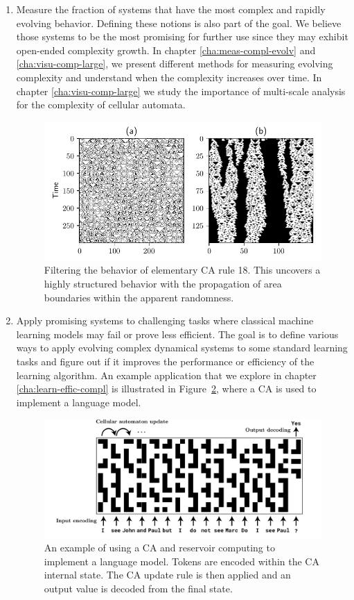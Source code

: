 \begin{enumerate}
  \item Measure the fraction of systems that have the most complex and rapidly
        evolving behavior. Defining these notions is also part of the goal. We
        believe those systems to be the most promising for further use since
        they may exhibit open-ended complexity growth. In chapter
        \ref{cha:meas-compl-evolv} and \ref{cha:visu-comp-large}, we present
        different methods for measuring evolving complexity and understand when
        the complexity increases over time. In chapter \ref{cha:visu-comp-large}
        we study the importance of multi-scale analysis for the complexity of
        cellular automata.
\begin{figure}[htbp]
  \centering
 \includegraphics[width=.9\linewidth]{figures/rule18_small}
 \caption{Filtering the behavior of elementary \acl{CA} rule 18. This
   uncovers a highly structured behavior with the propagation of area boundaries
   within the apparent randomness.}
  \label{fig:rule_18}
\end{figure}

  \item Apply promising systems to challenging tasks where classical machine
        learning models may fail or prove less efficient. The goal is to define
        various ways to apply evolving complex dynamical systems to some
        standard learning tasks and figure out if it improves the performance or
        efficiency of the learning algorithm. An example application that we
        explore in chapter \ref{cha:learn-effic-compl} is illustrated in
        Figure~\ref{fig:ca_lm}, where a \ac{CA} is used to implement a language
        model.
\begin{figure}[htbp]
  \centering
  \includegraphics[width=.9\linewidth]{figures/ca_lm}
  \caption{An example of using a \acl{CA} and reservoir computing to implement a
    language model. Tokens are encoded within the \acl{CA} internal state. The
    \acl{CA} update rule is then applied and an output value is decoded from the
    final state.}
  \label{fig:ca_lm}
\end{figure}


\end{enumerate}
